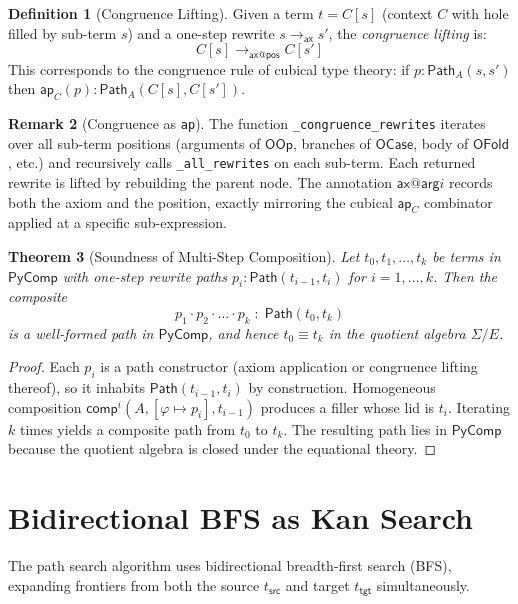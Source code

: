 \documentclass[11pt,a4paper]{report}
\theoremstyle{definition}
\newtheorem{definition}{Definition}[chapter]
\newtheorem{remark}[definition]{Remark}
\theoremstyle{plain}
\newtheorem{theorem}[definition]{Theorem}
\newcommand{\Path}{\mathsf{Path}}
\newcommand{\comp}{\mathsf{comp}}
\begin{document}
\begin{definition}[Congruence Lifting]
\label{def:congruence}
Given a term $t = C[s]$ (context $C$ with hole filled by sub-term $s$)
and a one-step rewrite $s \to_{\mathsf{ax}} s'$, the
\emph{congruence lifting} is:
\[
  C[s] \to_{\mathsf{ax}@\mathsf{pos}} C[s']
\]
This corresponds to the congruence rule of cubical type theory:
if $p : \Path_A(s, s')$ then $\mathsf{ap}_C(p) : \Path_A(C[s], C[s'])$.
\end{definition}

\begin{remark}[Congruence as \texttt{ap}]
The function \texttt{\_congruence\_rewrites} iterates over all
sub-term positions (arguments of $\mathsf{OOp}$, branches of
$\mathsf{OCase}$, body of $\mathsf{OFold}$, etc.) and recursively
calls \texttt{\_all\_rewrites} on each sub-term.  Each returned
rewrite is lifted by rebuilding the parent node.  The annotation
$\mathsf{ax}@\mathsf{arg}i$ records both the axiom and the position,
exactly mirroring the cubical $\mathsf{ap}_C$ combinator applied
at a specific sub-expression.
\end{remark}

\begin{theorem}[Soundness of Multi-Step Composition]
\label{thm:kan-soundness}
Let $t_0, t_1, \ldots, t_k$ be terms in $\mathsf{PyComp}$ with
one-step rewrite paths $p_i : \Path(t_{i-1}, t_i)$ for
$i = 1, \ldots, k$.  Then the composite
\[
  p_1 \cdot p_2 \cdot \ldots \cdot p_k \;:\; \Path(t_0, t_k)
\]
is a well-formed path in $\mathsf{PyComp}$, and hence $t_0 \equiv t_k$
in the quotient algebra $\Sigma/E$.
\end{theorem}

\begin{proof}
Each $p_i$ is a path constructor (axiom application or congruence
lifting thereof), so it inhabits $\Path(t_{i-1}, t_i)$ by
construction.  Homogeneous composition
$\comp^i(A, [\varphi \mapsto p_i], t_{i-1})$ produces a filler whose
lid is $t_i$.  Iterating $k$ times yields a composite path from $t_0$
to $t_k$.  The resulting path lies in $\mathsf{PyComp}$ because the
quotient algebra is closed under the equational theory.
\end{proof}

\section{Bidirectional BFS as Kan Search}

The path search algorithm uses bidirectional breadth-first search (BFS),
expanding frontiers from both the source $t_{\mathsf{src}}$ and target
$t_{\mathsf{tgt}}$ simultaneously.
\end{document}
